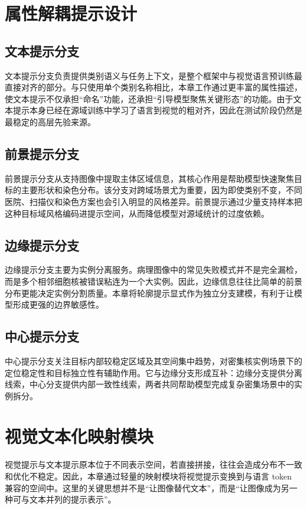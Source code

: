 \section{属性解耦提示设计}
\subsection{文本提示分支}
文本提示分支负责提供类别语义与任务上下文，是整个框架中与视觉语言预训练最直接对齐的部分。与只使用单个类别名称相比，本章工作通过更丰富的属性描述，使文本提示不仅承担“命名”功能，还承担“引导模型聚焦关键形态”的功能。由于文本提示本身已经在源域训练中学习了语言到视觉的粗对齐，因此在测试阶段仍然是最稳定的高层先验来源。

\subsection{前景提示分支}
前景提示分支从支持图像中提取主体区域信息，其核心作用是帮助模型快速聚焦目标的主要形状和染色分布。该分支对跨域场景尤为重要，因为即使类别不变，不同医院、扫描仪和染色方案也会引入明显的风格差异。前景提示通过少量支持样本把这种目标域风格编码进提示空间，从而降低模型对源域统计的过度依赖。

\subsection{边缘提示分支}
边缘提示分支主要为实例分离服务。病理图像中的常见失败模式并不是完全漏检，而是多个相邻细胞核被错误粘连为一个大实例。因此，边缘信息往往比简单的前景分布更能决定实例分割质量。本章将轮廓提示显式作为独立分支建模，有利于让模型形成更强的边界敏感性。

\subsection{中心提示分支}
中心提示分支关注目标内部较稳定区域及其空间集中趋势，对密集核实例场景下的定位稳定性和目标独立性有辅助作用。它与边缘分支形成互补：边缘分支提供分离线索，中心分支提供内部一致性线索，两者共同帮助模型完成复杂密集场景中的实例拆分。

\section{视觉文本化映射模块}
视觉提示与文本提示原本位于不同表示空间，若直接拼接，往往会造成分布不一致和优化不稳定。因此，本章通过轻量的映射模块将视觉提示变换到与语言 token 兼容的空间中。这里的关键思想并不是“让图像替代文本”，而是“让图像成为另一种可与文本并列的提示表示”。

